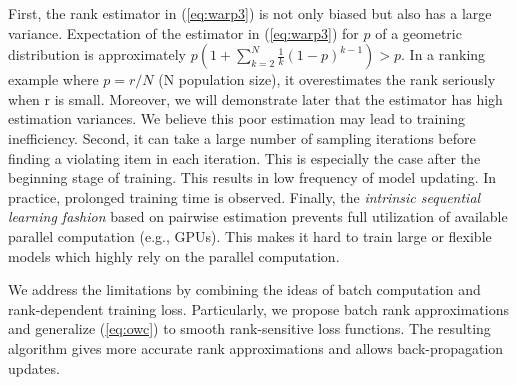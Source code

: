 \documentclass[letterpaper]{article} %
\begin{document}
First, the rank estimator in (\ref{eq:warp3}) is not only biased but also has a large variance. Expectation of the estimator in (\ref{eq:warp3}) for $p$ of a geometric distribution is approximately $p (1+ \sum_{k=2}^N \frac{1}{k} (1-p)^{k-1}) > p$. In a ranking example where $p = r / N$ (N population size), it overestimates the rank seriously when r is small. Moreover, we will demonstrate later that the estimator has high estimation variances. We believe this poor estimation may lead to training inefficiency. %
Second, it can take a large number of sampling iterations before finding a violating item in each iteration. This is especially the case after the beginning stage of training. This results in low frequency of model updating. In practice, prolonged training time is observed.
Finally, the \textit{intrinsic sequential learning fashion} based on pairwise estimation prevents full utilization of available parallel computation (e.g., GPUs). This makes it hard to train large or flexible models which highly rely on the parallel computation.



We address the limitations by combining the ideas of batch computation and rank-dependent training loss. Particularly, we propose batch rank approximations and generalize (\ref{eq:owc}) to smooth rank-sensitive loss functions. The resulting algorithm gives more accurate rank approximations and allows back-propagation updates.
\end{document}
